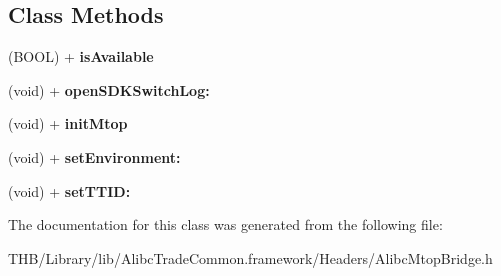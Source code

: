 \subsection*{Class Methods}
\begin{DoxyCompactItemize}
\item 
\mbox{\label{interface_alibc_mtop_bridge_a1daa6fdbbcea92d95a564c495ccda52b}} 
(B\+O\+OL) + {\bfseries is\+Available}
\item 
\mbox{\label{interface_alibc_mtop_bridge_adbb4f4729d086c7bd6f02bf174c3096c}} 
(void) + {\bfseries open\+S\+D\+K\+Switch\+Log\+:}
\item 
\mbox{\label{interface_alibc_mtop_bridge_ad3f54450167deaa49f86bc7f87532f57}} 
(void) + {\bfseries init\+Mtop}
\item 
\mbox{\label{interface_alibc_mtop_bridge_a18a9d7061bbdbf51ae6bb1b26be720a9}} 
(void) + {\bfseries set\+Environment\+:}
\item 
\mbox{\label{interface_alibc_mtop_bridge_a3a590e6423e279b2b83cf8d479036d71}} 
(void) + {\bfseries set\+T\+T\+I\+D\+:}
\end{DoxyCompactItemize}


The documentation for this class was generated from the following file\+:\begin{DoxyCompactItemize}
\item 
T\+H\+B/\+Library/lib/\+Alibc\+Trade\+Common.\+framework/\+Headers/Alibc\+Mtop\+Bridge.\+h\end{DoxyCompactItemize}
